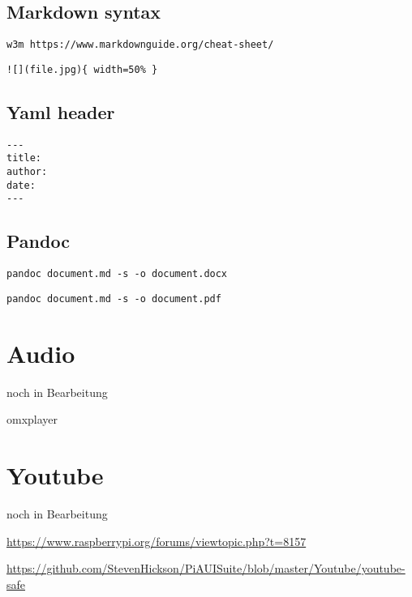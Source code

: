 \documentclass[]{book}
\begin{document}
\hypertarget{markdown-syntax}{%
\section{Markdown syntax}\label{markdown-syntax}}

\begin{verbatim}
w3m https://www.markdownguide.org/cheat-sheet/
\end{verbatim}

\begin{verbatim}
![](file.jpg){ width=50% }
\end{verbatim}

\hypertarget{yaml-header}{%
\section{Yaml header}\label{yaml-header}}

\begin{verbatim}
---
title:
author:
date:
---
\end{verbatim}

\hypertarget{pandoc}{%
\section{Pandoc}\label{pandoc}}

\begin{verbatim}
pandoc document.md -s -o document.docx
\end{verbatim}

\begin{verbatim}
pandoc document.md -s -o document.pdf
\end{verbatim}

\hypertarget{audio}{%
\chapter{Audio}\label{audio}}

noch in Bearbeitung

omxplayer

\hypertarget{youtube}{%
\chapter{Youtube}\label{youtube}}

noch in Bearbeitung

\url{https://www.raspberrypi.org/forums/viewtopic.php?t=8157}

\url{https://github.com/StevenHickson/PiAUISuite/blob/master/Youtube/youtube-safe}
\end{document}
